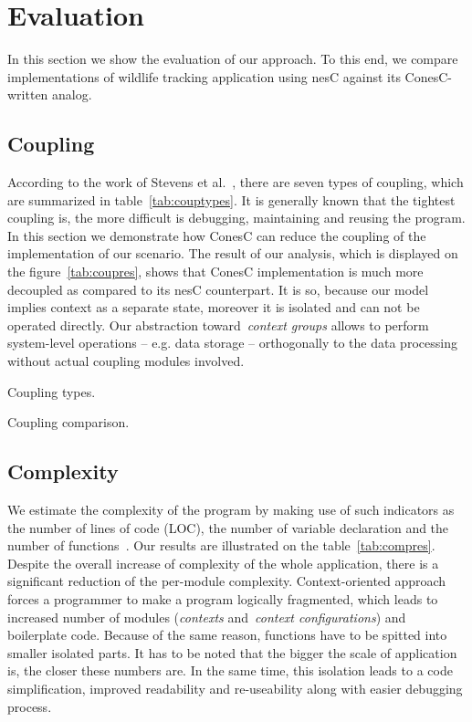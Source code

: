 \section{Evaluation}\label{sec:eval}

In this section we show the evaluation of our approach. To this end, we compare
implementations of wildlife tracking application using nesC against its ConesC-written analog.

\subsection{Coupling}\label{sec:evalcomp}

According to the work of Stevens et al.~\cite{stevens79}, there are seven types
of coupling, which are summarized in table~\ref{tab:couptypes}. It is generally
known that the tightest coupling is, the more difficult is debugging,
maintaining and reusing the program. In this section we demonstrate how ConesC
can reduce the coupling of the implementation of our scenario. The result of our
analysis, which is displayed on the figure~\ref{tab:coupres}, shows that ConesC
implementation is much more decoupled as compared to its nesC counterpart. It is
so, because our model implies context as a separate state, moreover it is
isolated and can not be operated directly. Our abstraction toward~\emph{context
groups} allows to perform system-level operations -- e.g. data storage --
orthogonally to the data processing without actual coupling modules involved.

\begin{table}[!h]
\renewcommand{\arraystretch}{1.3}
\caption{Coupling types.}
\label{tab:couptypes}

\end{table}

\begin{table}[!h]
\renewcommand{\arraystretch}{1.3}
\caption{Coupling comparison.}
\label{tab:coupres}

\end{table}

\subsection{Complexity} 

We estimate the complexity of the program by making use of such indicators as the number of
lines of code (LOC), the number of variable declaration and the number of
functions~\cite{pressman01}. Our results are illustrated on the
table~\ref{tab:compres}. Despite the overall increase of complexity of the whole
application, there is a significant reduction of the per-module complexity.
Context-oriented approach forces a programmer to make a program logically
fragmented, which leads to increased number of modules (\emph{contexts}
and~\emph{context configurations}) and boilerplate code. Because of the same
reason, functions have to be spitted into smaller isolated parts. It has to be
noted that the bigger the scale of application is, the closer these numbers are.
In the same time, this isolation leads to a code simplification, improved
readability and re-useability along with easier debugging process.

